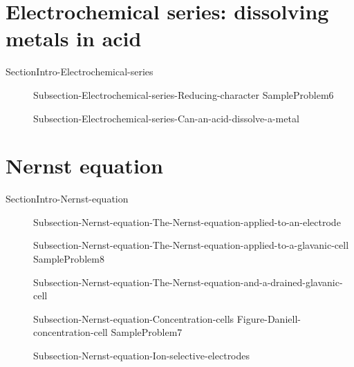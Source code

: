\documentclass[main.tex]{subfiles}
\newcommand\chapterlabel{Ch-electrochem}\setcounter{figurenewcounter}{0}\setcounter{tablenewcounter}{0}\setcounter{formulanewcounter}{0}\chapterpicture{../{\chapterlabel}/figure1}\chapterpicturelabel{PxFuel}
\begin{document}
\section{Electrochemical series: dissolving metals in acid}{SectionIntro-Electrochemical-series}
\sloppy\begin{description}
   \item[] {Subsection-Electrochemical-series-Reducing-character}
  {SampleProblem6}
\item[] {Subsection-Electrochemical-series-Can-an-acid-dissolve-a-metal}
\end{description}


\section{Nernst equation}{SectionIntro-Nernst-equation}
\sloppy\begin{description}
   \item[] {Subsection-Nernst-equation-The-Nernst-equation-applied-to-an-electrode}
   \item[] {Subsection-Nernst-equation-The-Nernst-equation-applied-to-a-glavanic-cell}
     {SampleProblem8}
   \item[] {Subsection-Nernst-equation-The-Nernst-equation-and-a-drained-glavanic-cell}
   \item[] {Subsection-Nernst-equation-Concentration-cells}
{Figure-Daniell-concentration-cell}
  {SampleProblem7}
   \item[] {Subsection-Nernst-equation-Ion-selective-electrodes}
\end{description}
 
\end{document}
